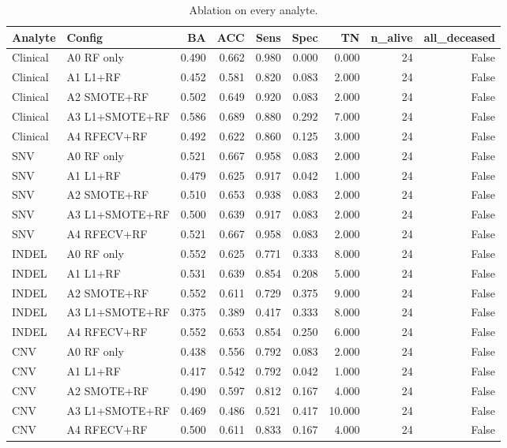 \begin{table}[t]
\centering
\caption{Ablation on every analyte.}
\begin{tabular}{llrrrrrrr}
\hline
Analyte & Config & BA & ACC & Sens & Spec & TN & n\_alive & all\_deceased \\
\hline
Clinical & A0 RF only & 0.490 & 0.662 & 0.980 & 0.000 & 0.000 & 24 & False \\
Clinical & A1 L1+RF & 0.452 & 0.581 & 0.820 & 0.083 & 2.000 & 24 & False \\
Clinical & A2 SMOTE+RF & 0.502 & 0.649 & 0.920 & 0.083 & 2.000 & 24 & False \\
Clinical & A3 L1+SMOTE+RF & 0.586 & 0.689 & 0.880 & 0.292 & 7.000 & 24 & False \\
Clinical & A4 RFECV+RF & 0.492 & 0.622 & 0.860 & 0.125 & 3.000 & 24 & False \\
SNV & A0 RF only & 0.521 & 0.667 & 0.958 & 0.083 & 2.000 & 24 & False \\
SNV & A1 L1+RF & 0.479 & 0.625 & 0.917 & 0.042 & 1.000 & 24 & False \\
SNV & A2 SMOTE+RF & 0.510 & 0.653 & 0.938 & 0.083 & 2.000 & 24 & False \\
SNV & A3 L1+SMOTE+RF & 0.500 & 0.639 & 0.917 & 0.083 & 2.000 & 24 & False \\
SNV & A4 RFECV+RF & 0.521 & 0.667 & 0.958 & 0.083 & 2.000 & 24 & False \\
INDEL & A0 RF only & 0.552 & 0.625 & 0.771 & 0.333 & 8.000 & 24 & False \\
INDEL & A1 L1+RF & 0.531 & 0.639 & 0.854 & 0.208 & 5.000 & 24 & False \\
INDEL & A2 SMOTE+RF & 0.552 & 0.611 & 0.729 & 0.375 & 9.000 & 24 & False \\
INDEL & A3 L1+SMOTE+RF & 0.375 & 0.389 & 0.417 & 0.333 & 8.000 & 24 & False \\
INDEL & A4 RFECV+RF & 0.552 & 0.653 & 0.854 & 0.250 & 6.000 & 24 & False \\
CNV & A0 RF only & 0.438 & 0.556 & 0.792 & 0.083 & 2.000 & 24 & False \\
CNV & A1 L1+RF & 0.417 & 0.542 & 0.792 & 0.042 & 1.000 & 24 & False \\
CNV & A2 SMOTE+RF & 0.490 & 0.597 & 0.812 & 0.167 & 4.000 & 24 & False \\
CNV & A3 L1+SMOTE+RF & 0.469 & 0.486 & 0.521 & 0.417 & 10.000 & 24 & False \\
CNV & A4 RFECV+RF & 0.500 & 0.611 & 0.833 & 0.167 & 4.000 & 24 & False \\

\end{tabular}
\end{table}
